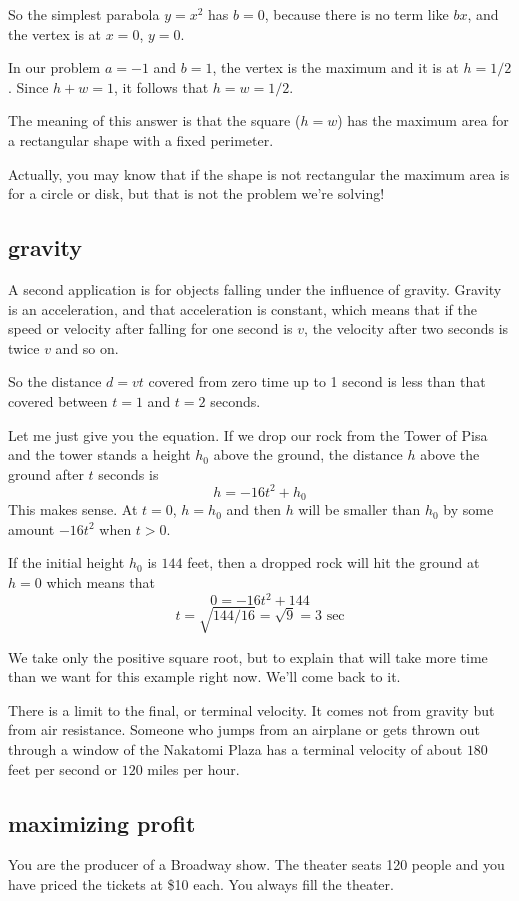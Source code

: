\documentclass[11pt, oneside]{article}
\begin{document}
So the simplest parabola $y = x^2$ has $b = 0$, because there is no term like $bx$, and the vertex is at $x = 0$, $y = 0$.

In our problem $a = -1$ and $b = 1$, the vertex is the maximum and it is at $h = 1/2$.   Since $h + w = 1$, it follows that $h = w = 1/2$.

The meaning of this answer is that the square ($h = w$) has the maximum area for a rectangular shape with a fixed perimeter.

Actually, you may know that if the shape is not rectangular the maximum area is for a circle or disk, but that is not the problem we're solving!

\subsection*{gravity}

A second application is for objects falling under the influence of gravity.  Gravity is an acceleration, and that acceleration is constant, which means that if the speed or velocity after falling for one second is $v$, the velocity after two seconds is twice $v$ and so on.  

So the distance $d = vt$ covered from zero time up to 1 second is less than that covered between $t = 1$ and $t = 2$ seconds.  

Let me just give you the equation.  If we drop our rock from the Tower of Pisa and the tower stands a height $h_0$ above the ground, the distance $h$ above the ground after $t$ seconds is
\[ h = -16t^2 + h_0 \]
This makes sense.  At $t = 0$, $h = h_0$ and then $h$ will be smaller than $h_0$ by some amount $-16t^2$ when $t > 0$.

If the initial height $h_0$ is $144$ feet, then a dropped rock will hit the ground at $h=0$ which means that
\[ 0 = -16t^2 + 144 \]
\[ t = \sqrt{144/16} = \sqrt{9} = 3 \text{ sec} \]

We take only the positive square root, but to explain that will take more time than we want for this example right now.  We'll come back to it.

There is a limit to the final, or terminal velocity.  It comes not from gravity but from air resistance.  Someone who jumps from an airplane or gets thrown out through a window of the Nakatomi Plaza has a terminal velocity of about $180$ feet per second or $120$ miles per hour.

\subsection*{maximizing profit}
You are the producer of a Broadway show.  The theater seats 120 people and you have priced the tickets at \$10 each.  You always fill the theater.
\end{document}

